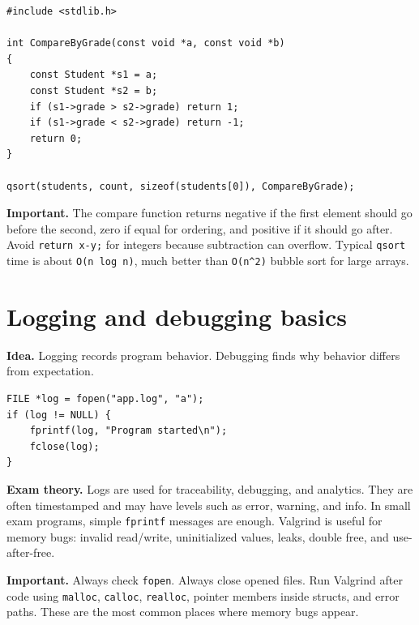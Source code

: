 \documentclass[10pt,a4paper]{article}
\newcommand{\idea}{\noindent\textbf{\textcolor{accentdark}{Idea.}} }
\newcommand{\theory}{\noindent\textbf{\textcolor{accentdark}{Exam theory.}} }
\newcommand{\important}[1]{\par\smallskip\noindent\colorbox{softyellow}{\parbox{\dimexpr\linewidth-2\fboxsep}{\textbf{\textcolor{accentdark}{Important.}} #1}}\par\smallskip}
\begin{document}
\begin{lstlisting}[caption={qsort on Student structs}]
#include <stdlib.h>

int CompareByGrade(const void *a, const void *b)
{
    const Student *s1 = a;
    const Student *s2 = b;
    if (s1->grade > s2->grade) return 1;
    if (s1->grade < s2->grade) return -1;
    return 0;
}

qsort(students, count, sizeof(students[0]), CompareByGrade);
\end{lstlisting}

\important{The compare function returns negative if the first element should go before the second, zero if equal for ordering, and positive if it should go after. Avoid \texttt{return x-y;} for integers because subtraction can overflow. Typical \texttt{qsort} time is about \texttt{O(n log n)}, much better than \texttt{O(n\^{}2)} bubble sort for large arrays.}

\section{Logging and debugging basics}
\idea Logging records program behavior. Debugging finds why behavior differs from expectation.

\begin{lstlisting}[caption={Simple file logging}]
FILE *log = fopen("app.log", "a");
if (log != NULL) {
    fprintf(log, "Program started\n");
    fclose(log);
}
\end{lstlisting}

\theory Logs are used for traceability, debugging, and analytics. They are often timestamped and may have levels such as error, warning, and info. In small exam programs, simple \texttt{fprintf} messages are enough. Valgrind is useful for memory bugs: invalid read/write, uninitialized values, leaks, double free, and use-after-free.

\important{Always check \texttt{fopen}. Always close opened files. Run Valgrind after code using \texttt{malloc}, \texttt{calloc}, \texttt{realloc}, pointer members inside structs, and error paths. These are the most common places where memory bugs appear.}
\end{document}
